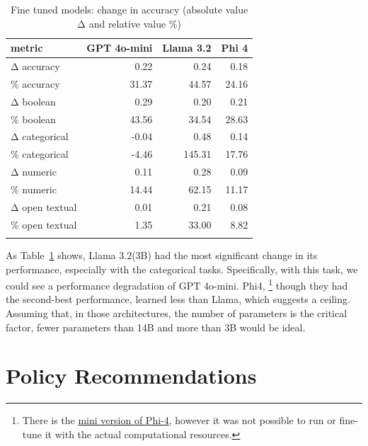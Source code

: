 \documentclass[
  12pt,
]{article}
\begin{document}
\begin{longtable}[t]{lrrr}

\toprule
metric & GPT 4o-mini & Llama 3.2 & Phi 4\\
\midrule
Δ accuracy & 0.22 & 0.24 & 0.18\\
\% accuracy & 31.37 & 44.57 & 24.16\\
Δ boolean & 0.29 & 0.20 & 0.21\\
\% boolean & 43.56 & 34.54 & 28.63\\
Δ categorical & -0.04 & 0.48 & 0.14\\
\addlinespace
\% categorical & -4.46 & 145.31 & 17.76\\
Δ numeric & 0.11 & 0.28 & 0.09\\
\% numeric & 14.44 & 62.15 & 11.17\\
Δ open textual & 0.01 & 0.21 & 0.08\\
\% open textual & 1.35 & 33.00 & 8.82\\
\bottomrule


\caption{\label{tbl-finetune-delta}Fine tuned models: change in accuracy
(absolute value Δ and relative value \%)}

\tabularnewline
\end{longtable}

As Table~\ref{tbl-finetune-delta} shows, Llama 3.2(3B) had the most
significant change in its performance, especially with the categorical
tasks. Specifically, with this task, we could see a performance
degradation of GPT 4o-mini. Phi4, \footnote{There is the
  \href{https://huggingface.co/microsoft/Phi-4-mini-instruct}{mini
  version of Phi-4}, however it was not possible to run or fine-tune it
  with the actual computational resources.} though they had the
second-best performance, learned less than Llama, which suggests a
ceiling. Assuming that, in those architectures, the number of parameters
is the critical factor, fewer parameters than 14B and more than 3B would
be ideal.

\section{Policy Recommendations}\label{policy-recommendations}
\end{document}
